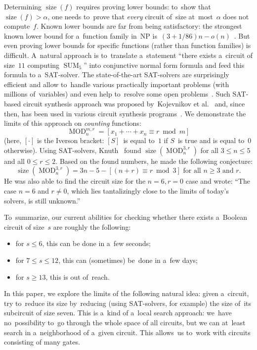 \documentclass[12pt,letterpaper]{article}
\DeclareMathOperator{\SUM}{SUM}
\DeclareMathOperator{\MOD}{MOD}
\DeclareMathOperator{\size}{size}
\begin{document}
Determining $\size(f)$ requires
proving lower bounds:
to~show that $\size(f)> \alpha$,
one needs to~prove that \emph{every} circuit
of~size at~most~$\alpha$ does not compute~$f$.
Known lower bounds are far from being satisfactory:
the strongest known lower bound for a~function family
in~NP is~$(3+1/86)n-o(n)$~\cite{}. But even proving
lower bounds for specific functions (rather than function families) is difficult. 
A~natural approach is to~translate a~statement ``there exists a~circuit of size~$11$ computing $\SUM_5$'' into conjunctive normal form formula and feed this formula
to a~SAT-solver. The state-of-the-art SAT-solvers are surprisingly efficient and allow to~handle
various practically important problems (with millions
of~variables) and even help to~resolve some open
problems~\cite{}. Such SAT-based circuit synthesis approach was proposed 
by~Kojevnikov et al.~\cite{DBLP:conf/sat/KojevnikovKY09}
and, since then, has been used in various circuit synthesis programs~\cite{}. We demonstrate the limits
of this approach on \emph{counting} functions:
\[\MOD_n^{m,r}=[x_1+\dotsb+x_n \equiv r \bmod m]\]
(here, $[\cdot]$ is the Iverson bracket: $[S]$~is equal to~$1$ if $S$~is true and is equal to~$0$ otherwise).
Using SAT-solvers, Knuth~\cite[solution to exercise~$480$]{Knuth:2015:ACP:2898950}
found $\size(\MOD_n^{3,r})$ for all $3 \le n \le 5$ and all $0 \le r \le 2$. Based on the found numbers, he made the following conjecture:
\begin{equation}\label{conjecture}
\size(\MOD_n^{3,r})=3n-5-[(n+r) \equiv r\bmod 3] \text{ for all $n \ge 3$ and $r$.}
\end{equation}
He was also able to find the circuit size 
for the $n=6,r=0$ case and wrote: ``The case $n=6$ and $r \neq 0$, which lies tantalizingly close to the limits of 
today's solvers, is still unknown.'' 

To~summarize, our current abilities for checking whether there exists a~Boolean circuit of size~$s$ are roughly the following: 
\begin{itemize}
\item for $s \le 6$, this can be done in a~few seconds;
\item for $7 \le s \le 12$, this can (sometimes) 
be~done in a~few days;
\item for $s \ge 13$, this is out of~reach.
\end{itemize}

In this paper, we explore the limits of the following natural idea: given a~circuit, try to~reduce its size by~reducing (using SAT-solvers, for example) the size 
of~its subcircuit of size seven. This is a~kind of a~local search approach: we~have no~possibility to~go through the whole space of all circuits, but we can at~least
search in a~neighborhood of a~given circuit. 
This allows~us to~work with circuits consisting
of many gates. 
\end{document}
